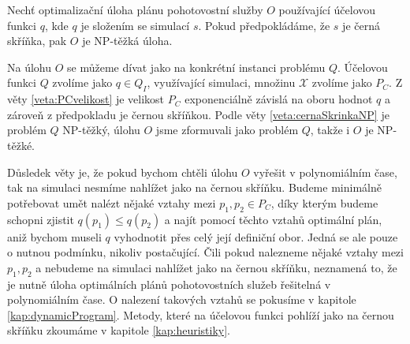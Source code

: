 \begin{veta}\label{veta:simulaceJakoCernaSkrinka}
  Nechť optimalizační úloha plánu pohotovostní služby $O$ používající účelovou funkci $q$, kde $q$ je složením se simulací $s$.
  Pokud předpokládáme, že $s$ je černá skříňka, pak $O$ je NP-těžká úloha.
\end{veta}

\begin{dukaz}
  Na úlohu $O$ se můžeme dívat jako na konkrétní instanci problému $Q$.
  Účelovou funkci $Q$ zvolíme jako $q \in Q_I$, využívající simulaci, množinu $\mathcal{X}$ zvolíme jako $P_C$.
  Z věty \ref{veta:PCvelikost} je velikost $P_C$ exponenciálně závislá na oboru hodnot $q$ a zároveň z předpokladu je černou skříňkou. 
  Podle věty \ref{veta:cernaSkrinkaNP} je problém $Q$ NP-těžký, úlohu $O$ jsme zformuvali jako problém $Q$, takže i $O$ je NP-těžké.
\end{dukaz}

Důsledek věty je, že pokud bychom chtěli úlohu $O$ vyřešit v polynomiálním čase,
tak na simulaci nesmíme nahlížet jako na černou skříňku.
Budeme minimálně potřebovat umět nalézt nějaké vztahy mezi $p_1, p_2 \in P_C$, díky kterým budeme schopni zjistit $q(p_1) \leq q(p_2)$
a najít pomocí těchto vztahů optimální plán, aniž bychom museli $q$ vyhodnotit přes celý její definiční obor.
Jedná se ale pouze o nutnou podmínku, nikoliv postačující. Čili pokud nalezneme nějaké vztahy mezi $p_1, p_2$ a nebudeme na simulaci nahlížet jako na černou skříňku,
neznamená to, že je nutně úloha optimálních plánů pohotovostních služeb řešitelná v polynomiálním čase.
O nalezení takových vztahů se pokusíme v kapitole \ref{kap:dynamicProgram}. Metody, které na účelovou funkci pohlíží jako na černou skříňku zkoumáme v kapitole \ref{kap:heuristiky}.


